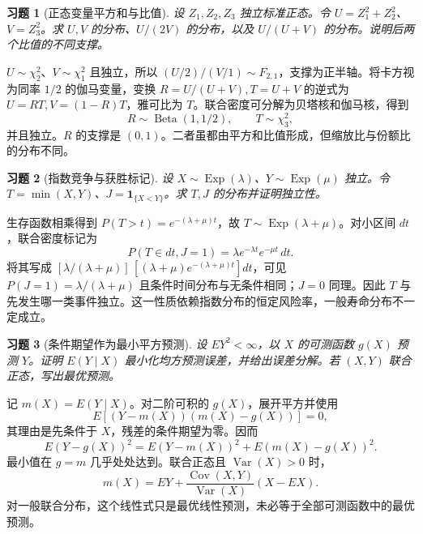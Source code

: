 \documentclass[12pt,fontset=fandol]{ctexart}
\newtheorem{exercise}{习题}[section]
\begin{document}
\begin{exercise}[正态变量平方和与比值]\label{q:B17.6}
设 $Z_1,Z_2,Z_3$ 独立标准正态。令 $U=Z_1^2+Z_2^2$、$V=Z_3^2$。求 $U,V$ 的分布、$U/(2V)$ 的分布，以及 $U/(U+V)$ 的分布。说明后两个比值的不同支撑。\par{}
\end{exercise}

\begin{solve}\label{a:B17.6}$U\sim\chi^2_2$、$V\sim\chi^2_1$ 且独立，所以 $(U/2)/(V/1)\sim F_{2,1}$，支撑为正半轴。将卡方视为同率 $1/2$ 的伽马变量，变换 $R=U/(U+V),T=U+V$ 的逆式为 $U=RT,V=(1-R)T$，雅可比为 $T$。联合密度可分解为贝塔核和伽马核，得到\[R\sim\operatorname{Beta}(1,1/2),\qquad T\sim\chi^2_3,\]并且独立。$R$ 的支撑是 $(0,1)$。二者虽都由平方和比值形成，但缩放比与份额比的分布不同。\end{solve}

\begin{exercise}[指数竞争与获胜标记]\label{q:B17.7}
设 $X\sim\operatorname{Exp}(\lambda)$、$Y\sim\operatorname{Exp}(\mu)$ 独立。令 $T=\min(X,Y)$、$J=\mathbf1_{\{X<Y\}}$。求 $T,J$ 的分布并证明独立性。\par{}
\end{exercise}

\begin{solve}\label{a:B17.7}生存函数相乘得到 $P(T>t)=e^{-(\lambda+\mu)t}$，故 $T\sim\operatorname{Exp}(\lambda+\mu)$。对小区间 $dt$，联合密度标记为\[P(T\in dt,J=1)=\lambda e^{-\lambda t}e^{-\mu t}\,dt.\]将其写成 $[\lambda/(\lambda+\mu)]\,[(\lambda+\mu)e^{-(\lambda+\mu)t}]dt$，可见 $P(J=1)=\lambda/(\lambda+\mu)$ 且条件时间分布与无条件相同；$J=0$ 同理。因此 $T$ 与先发生哪一类事件独立。这一性质依赖指数分布的恒定风险率，一般寿命分布不一定成立。\end{solve}

\begin{exercise}[条件期望作为最小平方预测]\label{q:B17.8}
设 $EY^2<\infty$，以 $X$ 的可测函数 $g(X)$ 预测 $Y$。证明 $E(Y\mid X)$ 最小化均方预测误差，并给出误差分解。若 $(X,Y)$ 联合正态，写出最优预测。\par{}
\end{exercise}

\begin{solve}\label{a:B17.8}记 $m(X)=E(Y\mid X)$。对二阶可积的 $g(X)$，展开平方并使用\[E[(Y-m(X))(m(X)-g(X))]=0,\]其理由是先条件于 $X$，残差的条件期望为零。因而\[E(Y-g(X))^2=E(Y-m(X))^2+E(m(X)-g(X))^2.\]最小值在 $g=m$ 几乎处处达到。联合正态且 $\operatorname{Var}(X)>0$ 时，\[m(X)=EY+\frac{\operatorname{Cov}(X,Y)}{\operatorname{Var}(X)}(X-EX).\]对一般联合分布，这个线性式只是最优线性预测，未必等于全部可测函数中的最优预测。\end{solve}
\end{document}
